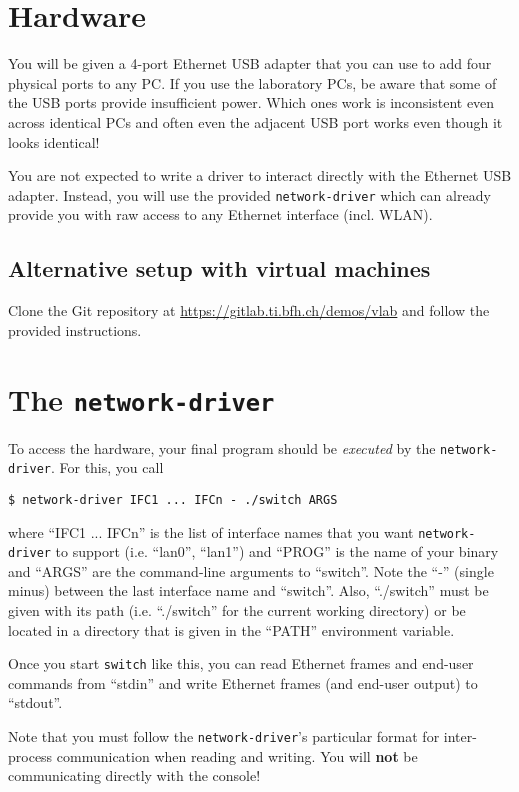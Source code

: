 \section{Hardware}

You will be given a 4-port Ethernet USB adapter that you can use to
add four physical ports to any PC.  If you use the laboratory PCs, be
aware that some of the USB ports provide insufficient power. Which
ones work is inconsistent even across identical PCs and often even the
adjacent USB port works even though it looks identical!

You are not expected to write a driver to interact directly with the
Ethernet USB adapter.  Instead, you will use the provided
{\tt network-driver} which can already provide you with raw access
to any Ethernet interface (incl. WLAN).

\subsection{Alternative setup with virtual machines}


Clone the Git repository at
\url{https://gitlab.ti.bfh.ch/demos/vlab} and follow the provided
instructions.

\section{The {\tt network-driver}}

To access the hardware, your final program should be {\em executed}
by the {\tt network-driver}.  For this, you call
\begin{verbatim}
$ network-driver IFC1 ... IFCn - ./switch ARGS
\end{verbatim}
where ``IFC1 ... IFCn'' is the list of interface names that you want
{\tt network-driver} to support (i.e. ``lan0'', ``lan1'') and ``PROG''
is the name of your binary and ``ARGS'' are the command-line arguments
to ``switch''.  Note the ``-'' (single minus) between the last
interface name and ``switch''.  Also, ``./switch'' must be given with
its path (i.e. ``./switch'' for the current working directory) or be
located in a directory that is given in the ``PATH'' environment
variable.

Once you start {\tt switch} like this, you can read Ethernet frames
and end-user commands from ``stdin'' and write Ethernet
frames (and end-user output) to ``stdout''.

Note that you must follow the {\tt network-driver}'s particular
format for inter-process communication when reading and writing.
You will {\bf not} be communicating directly with the console!


